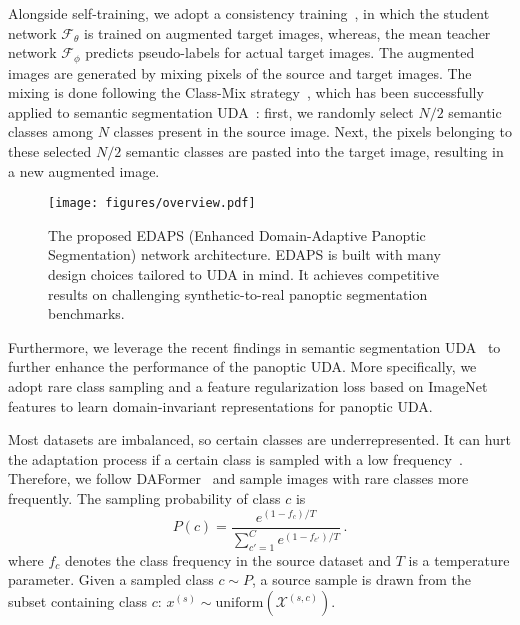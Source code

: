 \documentclass[10pt,twocolumn,letterpaper]{article}
\makeatletter
\renewcommand{\paragraph}{\@startsection{paragraph}{4}{\z@}{1.0ex \@plus 1ex \@minus .2ex}{-1em}{\normalfont\normalsize\bfseries}}
\makeatother
\begin{document}
Alongside self-training, we adopt a consistency training~\cite{sajjadi2016regularization, tarvainen2017mean, sohn2020fixmatch},
in which the student network $\mathcal{F}_\theta$ is trained on augmented target images,
whereas, the mean teacher network $\mathcal{F}_\phi$ predicts pseudo-labels for actual target images.
The augmented images are generated by mixing pixels of the source and target images.
The mixing is done following the Class-Mix strategy~\cite{olsson2021classmix}, which has been successfully applied to semantic segmentation UDA~\cite{tranheden2021dacs,liu2021bapa,hoyer2021daformer}: first, we randomly select $N/2$ semantic classes among $N$ classes present in the source image.
Next, the pixels belonging to these selected $N/2$ semantic classes are pasted into the target image, resulting in a new augmented image.

\begin{figure*}[t!]
  \centering
  \texttt{[image: figures/overview.pdf]}
  \caption{
    The proposed EDAPS (Enhanced Domain-Adaptive Panoptic Segmentation) network architecture.
    EDAPS is built with many design choices tailored to UDA in mind. 
    It achieves competitive results on challenging synthetic-to-real panoptic segmentation benchmarks.
  }
  \label{fig:overview}
\end{figure*}

Furthermore, we leverage the recent findings in semantic segmentation UDA~\cite{hoyer2021improving} to further enhance the performance of the panoptic UDA.
More specifically, we adopt rare class sampling and a feature regularization loss based on ImageNet features to learn domain-invariant representations for panoptic UDA.

\paragraph{Rare Class Sampling (RCS)}
Most datasets are imbalanced, so certain classes are underrepresented. It can hurt the adaptation process if a certain class is sampled with a low frequency~\cite{hoyer2021daformer}. Therefore, we follow DAFormer~\cite{hoyer2021daformer} and sample images with rare classes more frequently. The sampling probability of class $c$ is
\begin{equation}
    P(c) = \frac{e^{(1-f_c) / T}}{\sum_{c'=1}^C e^{(1-f_{c'}) / T}}\,.
    \label{eq:P_c}
\end{equation}
where $f_c$ denotes the class frequency in the source dataset and $T$ is a temperature parameter. Given a sampled class $c \sim P$, a source sample is drawn from the subset containing class $c$: $x^{(s)} \sim \text{uniform}(\mathcal{X}^{(s,c)})$.
\end{document}
